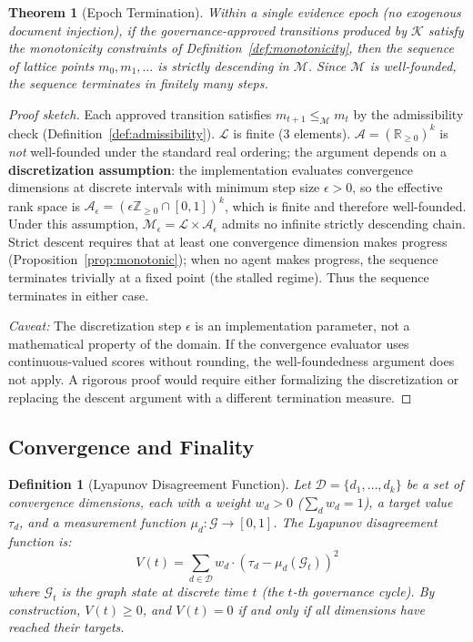 \documentclass[11pt]{article}
\newtheorem{definition}{Definition}
\newtheorem{theorem}{Theorem}
\begin{document}
\begin{theorem}[Epoch Termination]
\label{thm:termination}
Within a single evidence epoch (no exogenous document injection), if the governance-approved transitions produced by $\mathcal{K}$ satisfy the monotonicity constraints of Definition~\ref{def:monotonicity}, then the sequence of lattice points $m_0, m_1, \ldots$ is strictly descending in $\mathcal{M}$. Since $\mathcal{M}$ is well-founded, the sequence terminates in finitely many steps.
\end{theorem}

\begin{proof}[Proof sketch]
Each approved transition satisfies $m_{t+1} \leq_{\mathcal{M}} m_t$ by the admissibility check (Definition~\ref{def:admissibility}). $\mathcal{L}$ is finite (3 elements). $\mathcal{A} = (\mathbb{R}_{\geq 0})^k$ is \emph{not} well-founded under the standard real ordering; the argument depends on a \textbf{discretization assumption}: the implementation evaluates convergence dimensions at discrete intervals with minimum step size $\epsilon > 0$, so the effective rank space is $\mathcal{A}_\epsilon = (\epsilon\mathbb{Z}_{\geq 0} \cap [0,1])^k$, which is finite and therefore well-founded. Under this assumption, $\mathcal{M}_\epsilon = \mathcal{L} \times \mathcal{A}_\epsilon$ admits no infinite strictly descending chain. Strict descent requires that at least one convergence dimension makes progress (Proposition~\ref{prop:monotonic}); when no agent makes progress, the sequence terminates trivially at a fixed point (the stalled regime). Thus the sequence terminates in either case.

\emph{Caveat:} The discretization step $\epsilon$ is an implementation parameter, not a mathematical property of the domain. If the convergence evaluator uses continuous-valued scores without rounding, the well-foundedness argument does not apply. A rigorous proof would require either formalizing the discretization or replacing the descent argument with a different termination measure.
\end{proof}

\subsection{Convergence and Finality}

\begin{definition}[Lyapunov Disagreement Function]
\label{def:lyapunov}
Let $\mathcal{D} = \{d_1, \ldots, d_k\}$ be a set of convergence dimensions, each with a weight $w_d > 0$ ($\sum_d w_d = 1$), a target value $\tau_d$, and a measurement function $\mu_d : \mathcal{G} \to [0,1]$. The Lyapunov disagreement function is:
\[
V(t) = \sum_{d \in \mathcal{D}} w_d \cdot (\tau_d - \mu_d(\mathcal{G}_t))^2
\]
where $\mathcal{G}_t$ is the graph state at discrete time $t$ (the $t$-th governance cycle). By construction, $V(t) \geq 0$, and $V(t) = 0$ if and only if all dimensions have reached their targets.
\end{definition}
\end{document}

